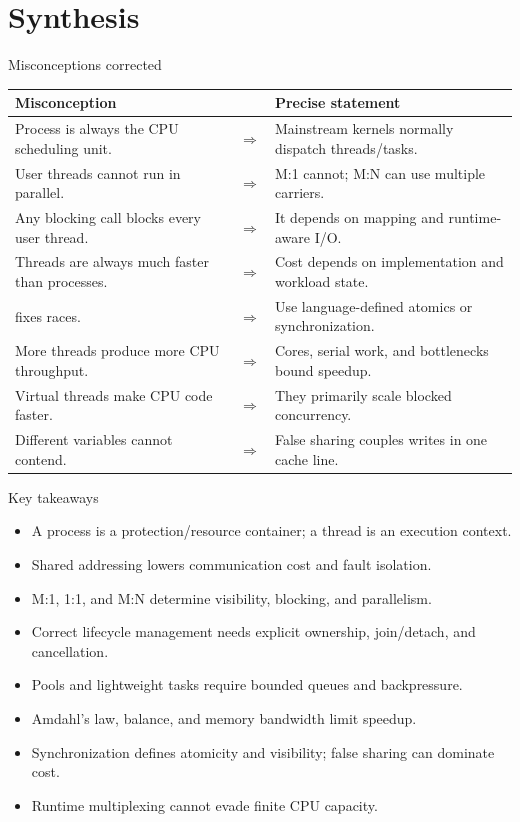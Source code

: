 \documentclass[aspectratio=169,11pt]{beamer}
\newcommand{\code}[1]{\texttt{\detokenize{#1}}}
\begin{document}
\section{Synthesis}

\begin{frame}{Misconceptions corrected}
  \scriptsize
  \begin{tabularx}{\textwidth}{@{}XcX@{}}
    \toprule
    \textbf{Misconception} & & \textbf{Precise statement} \\
    \midrule
    Process is always the CPU scheduling unit. & $\Rightarrow$ & Mainstream kernels normally dispatch threads/tasks. \\
    User threads cannot run in parallel. & $\Rightarrow$ & M:1 cannot; M:N can use multiple carriers. \\
    Any blocking call blocks every user thread. & $\Rightarrow$ & It depends on mapping and runtime-aware I/O. \\
    Threads are always much faster than processes. & $\Rightarrow$ & Cost depends on implementation and workload state. \\
    \code{volatile} fixes races. & $\Rightarrow$ & Use language-defined atomics or synchronization. \\
    More threads produce more CPU throughput. & $\Rightarrow$ & Cores, serial work, and bottlenecks bound speedup. \\
    Virtual threads make CPU code faster. & $\Rightarrow$ & They primarily scale blocked concurrency. \\
    Different variables cannot contend. & $\Rightarrow$ & False sharing couples writes in one cache line. \\
    \bottomrule
  \end{tabularx}
\end{frame}

\begin{frame}{Key takeaways}
  \begin{itemize}
    \item A process is a protection/resource container; a thread is an execution context.
    \item Shared addressing lowers communication cost and fault isolation.
    \item M:1, 1:1, and M:N determine visibility, blocking, and parallelism.
    \item Correct lifecycle management needs explicit ownership, join/detach, and cancellation.
    \item Pools and lightweight tasks require bounded queues and backpressure.
    \item Amdahl's law, balance, and memory bandwidth limit speedup.
    \item Synchronization defines atomicity and visibility; false sharing can dominate cost.
    \item Runtime multiplexing cannot evade finite CPU capacity.
  \end{itemize}
\end{frame}
\end{document}
